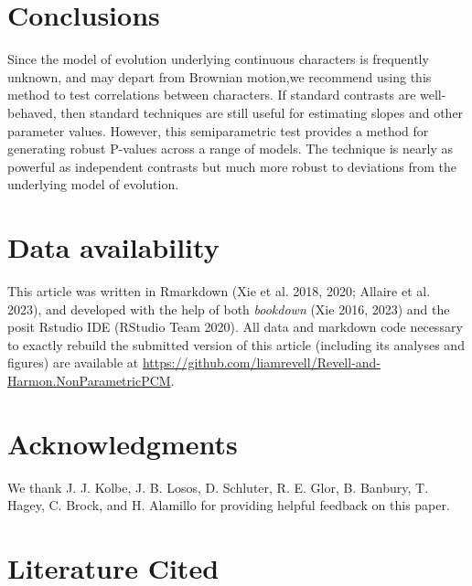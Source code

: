 \documentclass[fleqn,10pt,lineno]{wlpeerj} %
\begin{document}
\section{Conclusions}\label{conclusions}

Since the model of evolution underlying continuous characters is frequently unknown, and may depart from Brownian motion,we recommend using this method to test correlations between characters. If standard contrasts are well-behaved, then standard techniques are still useful for estimating slopes and other parameter values. However, this semiparametric test provides a method for generating robust P-values across a range of models. The technique is nearly as powerful as independent contrasts but much more robust to deviations from the underlying model of evolution.

\section{Data availability}\label{data-availability}

This article was written in Rmarkdown (Xie et al. 2018, 2020; Allaire et al. 2023), and developed with the help of both \emph{bookdown} (Xie 2016, 2023) and the posit Rstudio IDE (RStudio Team 2020). All data and markdown code necessary to exactly rebuild the submitted version of this article (including its analyses and figures) are available at \url{https://github.com/liamrevell/Revell-and-Harmon.NonParametricPCM}.

\section{Acknowledgments}\label{acknowledgments}

We thank J. J. Kolbe, J. B. Losos, D. Schluter, R. E. Glor, B. Banbury, T. Hagey, C. Brock, and H. Alamillo for providing helpful feedback on this paper.

\section*{Literature Cited}\label{literature-cited}
\end{document}
